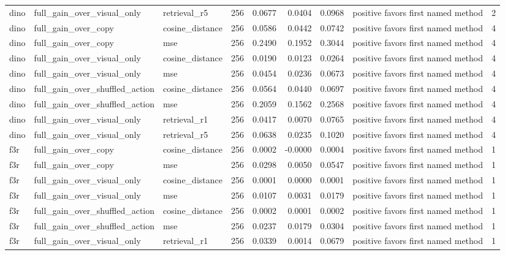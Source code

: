 \begin{tabular}{lllrrrrlr}
dino & full\_gain\_over\_visual\_only & retrieval\_r5 & 256 & 0.0677 & 0.0404 & 0.0968 & positive favors first named method & 2 \\
dino & full\_gain\_over\_copy & cosine\_distance & 256 & 0.0586 & 0.0442 & 0.0742 & positive favors first named method & 4 \\
dino & full\_gain\_over\_copy & mse & 256 & 0.2490 & 0.1952 & 0.3044 & positive favors first named method & 4 \\
dino & full\_gain\_over\_visual\_only & cosine\_distance & 256 & 0.0190 & 0.0123 & 0.0264 & positive favors first named method & 4 \\
dino & full\_gain\_over\_visual\_only & mse & 256 & 0.0454 & 0.0236 & 0.0673 & positive favors first named method & 4 \\
dino & full\_gain\_over\_shuffled\_action & cosine\_distance & 256 & 0.0564 & 0.0440 & 0.0697 & positive favors first named method & 4 \\
dino & full\_gain\_over\_shuffled\_action & mse & 256 & 0.2059 & 0.1562 & 0.2568 & positive favors first named method & 4 \\
dino & full\_gain\_over\_visual\_only & retrieval\_r1 & 256 & 0.0417 & 0.0070 & 0.0765 & positive favors first named method & 4 \\
dino & full\_gain\_over\_visual\_only & retrieval\_r5 & 256 & 0.0638 & 0.0235 & 0.1020 & positive favors first named method & 4 \\
f3r & full\_gain\_over\_copy & cosine\_distance & 256 & 0.0002 & -0.0000 & 0.0004 & positive favors first named method & 1 \\
f3r & full\_gain\_over\_copy & mse & 256 & 0.0298 & 0.0050 & 0.0547 & positive favors first named method & 1 \\
f3r & full\_gain\_over\_visual\_only & cosine\_distance & 256 & 0.0001 & 0.0000 & 0.0001 & positive favors first named method & 1 \\
f3r & full\_gain\_over\_visual\_only & mse & 256 & 0.0107 & 0.0031 & 0.0179 & positive favors first named method & 1 \\
f3r & full\_gain\_over\_shuffled\_action & cosine\_distance & 256 & 0.0002 & 0.0001 & 0.0002 & positive favors first named method & 1 \\
f3r & full\_gain\_over\_shuffled\_action & mse & 256 & 0.0237 & 0.0179 & 0.0304 & positive favors first named method & 1 \\
f3r & full\_gain\_over\_visual\_only & retrieval\_r1 & 256 & 0.0339 & 0.0014 & 0.0679 & positive favors first named method & 1 \\

\end{tabular}
